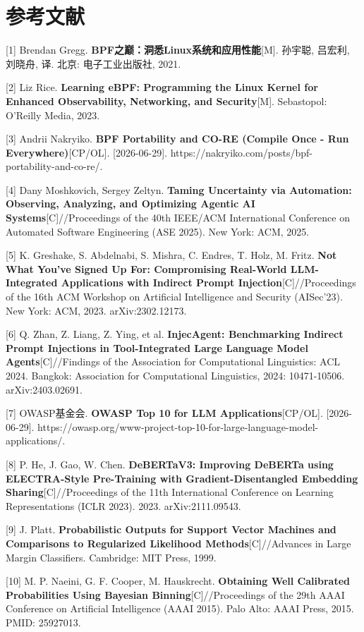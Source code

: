 \documentclass[a4paper]{ctexart}
\makeatletter
\renewcommand{\_}{%
  \ifmmode
    \nfss@text{\textunderscore}%
  \else
    \textunderscore\discretionary{}{}{}%
  \fi}
\makeatother
\begin{document}
\section*{参考文献}

[1] Brendan Gregg. \textbf{BPF之巅：洞悉Linux系统和应用性能}[M]. 孙宇聪, 吕宏利, 刘晓舟, 译. 北京: 电子工业出版社, 2021.


[2] Liz Rice. \textbf{Learning eBPF: Programming the Linux Kernel for Enhanced Observability, Networking, and Security}[M]. Sebastopol: O\textquoteright Reilly Media, 2023.


[3] Andrii Nakryiko. \textbf{BPF Portability and CO-RE (Compile Once - Run Everywhere)}[CP/OL]. [2026-06-29]. https://nakryiko.com/posts/bpf-portability-and-co-re/.


[4] Dany Moshkovich, Sergey Zeltyn. \textbf{Taming Uncertainty via Automation: Observing, Analyzing, and Optimizing Agentic AI Systems}[C]//Proceedings of the 40th IEEE/ACM International Conference on Automated Software Engineering (ASE 2025). New York: ACM, 2025.


[5] K. Greshake, S. Abdelnabi, S. Mishra, C. Endres, T. Holz, M. Fritz. \textbf{Not What You\textquoteright ve Signed Up For: Compromising Real-World LLM-Integrated Applications with Indirect Prompt Injection}[C]//Proceedings of the 16th ACM Workshop on Artificial Intelligence and Security (AISec'23). New York: ACM, 2023. arXiv:2302.12173.


[6] Q. Zhan, Z. Liang, Z. Ying, et al. \textbf{InjecAgent: Benchmarking Indirect Prompt Injections in Tool-Integrated Large Language Model Agents}[C]//Findings of the Association for Computational Linguistics: ACL 2024. Bangkok: Association for Computational Linguistics, 2024: 10471-10506. arXiv:2403.02691.


[7] OWASP基金会. \textbf{OWASP Top 10 for LLM Applications}[CP/OL]. [2026-06-29]. https://owasp.org/www-project-top-10-for-large-language-model-applications/.


[8] P. He, J. Gao, W. Chen. \textbf{DeBERTaV3: Improving DeBERTa using ELECTRA-Style Pre-Training with Gradient-Disentangled Embedding Sharing}[C]//Proceedings of the 11th International Conference on Learning Representations (ICLR 2023). 2023. arXiv:2111.09543.


[9] J. Platt. \textbf{Probabilistic Outputs for Support Vector Machines and Comparisons to Regularized Likelihood Methods}[C]//Advances in Large Margin Classifiers. Cambridge: MIT Press, 1999.


[10] M. P. Naeini, G. F. Cooper, M. Hauskrecht. \textbf{Obtaining Well Calibrated Probabilities Using Bayesian Binning}[C]//Proceedings of the 29th AAAI Conference on Artificial Intelligence (AAAI 2015). Palo Alto: AAAI Press, 2015. PMID: 25927013.
\end{document}
